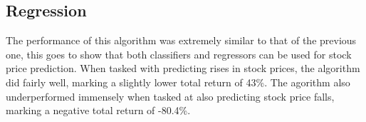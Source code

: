 \subsection{Regression}
The performance of this algorithm was extremely similar to that of the previous one, this goes to show that both classifiers and regressors can be used for stock price prediction. When tasked with predicting rises in stock prices, the algorithm did fairly well, marking a slightly lower total return of 43\%. The agorithm also underperformed immensely when tasked at also predicting stock price falls, marking a negative total return of -80.4\%.